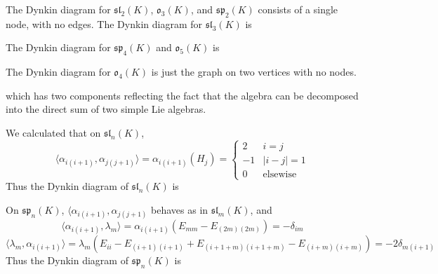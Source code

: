 \begin{example}
    The Dynkin diagram for $\mathfrak{sl}_2(K)$, $\mathfrak{o}_3(K)$, and $\mathfrak{sp}_2(K)$ consists of a single node, with no edges. The Dynkin diagram for $\mathfrak{sl}_3(K)$ is
    \begin{center}
  \end{center}
  The Dynkin diagram for $\mathfrak{sp}_4(K)$ and $\mathfrak{o}_5(K)$ is
%
    \begin{center}
  \end{center}
  The Dynkin diagram for $\mathfrak{o}_4(K)$ is just the graph on two vertices with no nodes.
      \begin{center}
  \end{center}
  which has two components reflecting the fact that the algebra can be decomposed into the direct sum of two simple Lie algebras.
\end{example}

\begin{example}
    We calculated that on $\mathfrak{sl}_n(K)$,
    \[ \langle \alpha_{i(i+1)}, \alpha_{j(j+1)} \rangle = \alpha_{i(i+1)}(H_j) = \begin{cases} 2 & i = j \\ -1 & |i - j| = 1 \\ 0 & \text{elsewise} \end{cases} \]
    Thus the Dynkin diagram of $\mathfrak{sl}_n(K)$ is
\end{example}

\begin{example}
    On $\mathfrak{sp}_n(K)$, $\langle \alpha_{i(i+1)}, \alpha_{j(j+1)}$ behaves as in $\mathfrak{sl}_m(K)$, and
    \[ \langle \alpha_{i(i+1)}, \lambda_m \rangle = \alpha_{i(i+1)}(E_{mm} - E_{(2m)(2m)}) = - \delta_{im} \]
    \[ \langle \lambda_m, \alpha_{i(i+1)} \rangle = \lambda_m(E_{ii} - E_{(i+1)(i+1)} + E_{(i+1+m)(i+1+m)} - E_{(i+m)(i+m)}) = -2 \delta_{m(i+1)} \]
    Thus the Dynkin diagram of $\mathfrak{sp}_n(K)$ is
\end{example}

